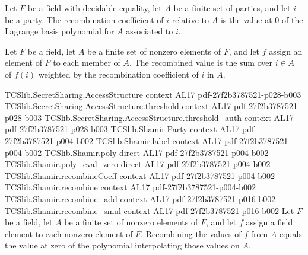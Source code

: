 \begin{definition}
\label{TCSlib.Shamir.recombineCoeff}
\leanok
{}
Let $F$ be a field with decidable equality, let $A$ be a finite set of parties, and let
$i$ be a party. The recombination coefficient of $i$ relative to $A$ is the value at $0$
of the Lagrange basis polynomial for $A$ associated to $i$.
\end{definition}

\begin{definition}
\label{TCSlib.Shamir.recombine}
\leanok
{}
Let $F$ be a field, let $A$ be a finite set of nonzero elements of $F$, and let $f$
assign an element of $F$ to each member of $A$. The recombined value is the sum over
$i\in A$ of $f(i)$ weighted by the recombination coefficient of $i$ in $A$.
\end{definition}

\begin{theorem}
\label{TCSlib.Shamir.recombine_eq_eval_interpolate}
\leanok
\proofstep
  {TCSlib.SecretSharing.AccessStructure}
  {context}
  {AL17}
  {pdf-27f2b3787521-p028-b003}
\proofstep
  {TCSlib.SecretSharing.AccessStructure.threshold}
  {context}
  {AL17}
  {pdf-27f2b3787521-p028-b003}
\proofstep
  {TCSlib.SecretSharing.AccessStructure.threshold_auth}
  {context}
  {AL17}
  {pdf-27f2b3787521-p028-b003}
\proofstep
  {TCSlib.Shamir.Party}
  {context}
  {AL17}
  {pdf-27f2b3787521-p004-b002}
\proofstep
  {TCSlib.Shamir.label}
  {context}
  {AL17}
  {pdf-27f2b3787521-p004-b002}
\proofstep
  {TCSlib.Shamir.poly}
  {direct}
  {AL17}
  {pdf-27f2b3787521-p004-b002}
\proofstep
  {TCSlib.Shamir.poly_eval_zero}
  {direct}
  {AL17}
  {pdf-27f2b3787521-p004-b002}
\proofstep
  {TCSlib.Shamir.recombineCoeff}
  {context}
  {AL17}
  {pdf-27f2b3787521-p004-b002}
\proofstep
  {TCSlib.Shamir.recombine}
  {context}
  {AL17}
  {pdf-27f2b3787521-p004-b002}
\proofstep
  {TCSlib.Shamir.recombine_add}
  {context}
  {AL17}
  {pdf-27f2b3787521-p016-b002}
\proofstep
  {TCSlib.Shamir.recombine_smul}
  {context}
  {AL17}
  {pdf-27f2b3787521-p016-b002}
Let $F$ be a field, let $A$ be a finite set of nonzero elements of $F$, and let $f$
assign a field element to each nonzero element of $F$. Recombining the values of $f$
from $A$ equals the value at zero of the polynomial interpolating those values on $A$.
\end{theorem}


